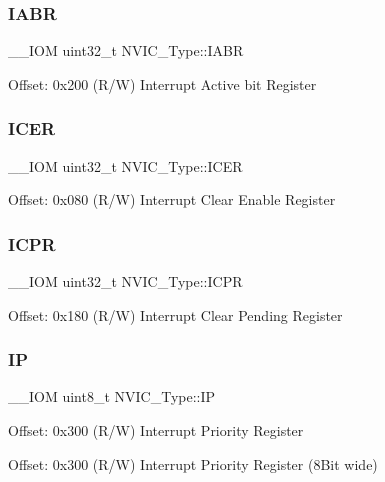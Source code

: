 \subsubsection{\texorpdfstring{IABR}{IABR}}
{\footnotesize\ttfamily \+\_\+\+\_\+\+I\+OM uint32\+\_\+t N\+V\+I\+C\+\_\+\+Type\+::\+I\+A\+BR}

Offset\+: 0x200 (R/W) Interrupt Active bit Register \mbox{\label{struct_n_v_i_c___type_aed882e10ea8ee6a915007af71643d7da}} 
\subsubsection{\texorpdfstring{ICER}{ICER}}
{\footnotesize\ttfamily \+\_\+\+\_\+\+I\+OM uint32\+\_\+t N\+V\+I\+C\+\_\+\+Type\+::\+I\+C\+ER}

Offset\+: 0x080 (R/W) Interrupt Clear Enable Register \mbox{\label{struct_n_v_i_c___type_aa056e3f59e88845ee47db4a43635b3a2}} 
\subsubsection{\texorpdfstring{ICPR}{ICPR}}
{\footnotesize\ttfamily \+\_\+\+\_\+\+I\+OM uint32\+\_\+t N\+V\+I\+C\+\_\+\+Type\+::\+I\+C\+PR}

Offset\+: 0x180 (R/W) Interrupt Clear Pending Register \mbox{\label{struct_n_v_i_c___type_a4eef47929a0d1317a107f1ac62e28464}} 
\subsubsection{\texorpdfstring{IP}{IP}\hspace{0.1cm}{\footnotesize\ttfamily [1/2]}}
{\footnotesize\ttfamily \+\_\+\+\_\+\+I\+OM uint8\+\_\+t N\+V\+I\+C\+\_\+\+Type\+::\+IP}

Offset\+: 0x300 (R/W) Interrupt Priority Register

Offset\+: 0x300 (R/W) Interrupt Priority Register (8Bit wide) \mbox{\label{struct_n_v_i_c___type_a9a4341692e45d089a113986a3d344e98}} 
